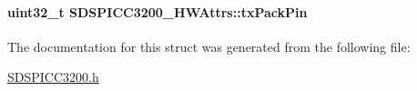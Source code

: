 \paragraph[{tx\-Pack\-Pin}]{\setlength{\rightskip}{0pt plus 5cm}uint32\-\_\-t S\-D\-S\-P\-I\-C\-C3200\-\_\-\-H\-W\-Attrs\-::tx\-Pack\-Pin}\label{struct_s_d_s_p_i_c_c3200___h_w_attrs_ac74ef997109f15ab77d18fac98bbf939}


The documentation for this struct was generated from the following file\-:\begin{DoxyCompactItemize}
\item 
\hyperlink{_s_d_s_p_i_c_c3200_8h}{S\-D\-S\-P\-I\-C\-C3200.\-h}\end{DoxyCompactItemize}
